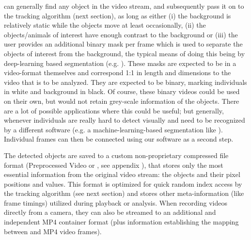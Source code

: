 \documentclass[9pt,lineno]{elife}
\newcommand{\TGrabs}{\protect\path{TGrabs}}
\begin{document}
{\color{blue}\TGrabs{} can generally find any object in the video stream, and subsequently pass it on to the tracking algorithm (next section),} as long as either (i) the background is relatively static while the objects move at least occasionally, (ii) the objects/animals of interest have enough contrast to the background or (iii) the user provides an additional binary mask per frame which is used to separate the objects {\color{blue}of interest} from the background, the typical means of doing this being by deep-learning based segmentation (e.g. \citealt{Cae+17}). These masks are expected to be in a video-format themselves and correspond 1:1 in length and dimensions to the video that is to be analyzed. They are expected to be binary, marking individuals in white and background in black. Of course, these binary videos could be {\color{blue} used} on their own, but would not retain grey-scale information {\color{blue} of the objects}. There are a lot of possible applications where this could be useful; but generally, whenever individuals are really hard to detect visually and need to be recognized by a different software (e.g. a machine-learning-based {\color{blue}segmentation} like \citealt{Man+18b}). Individual frames can then be connected using our software as a second step.

The detected objects are saved to a custom non-proprietary compressed file format (Preprocessed Video or \protect{}, see appendix ), that stores only the most essential information from the original video stream: the objects and their pixel positions and values. This format is optimized for quick random index access by the tracking {\color{blue}algorithm (see next section)} and stores other meta-information (like frame timings) utilized during playback or analysis. When recording videos directly from a camera, they can also be streamed to an additional and independent MP4 container format (plus information establishing the mapping between \protect{} and MP4 video frames).
\end{document}
